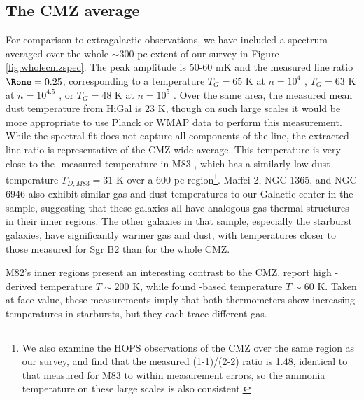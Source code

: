 \subsection{The CMZ average}
For comparison to extragalactic observations, we have included a spectrum
averaged over the whole $\sim300$ pc extent of our survey in Figure
\ref{fig:wholecmzspec}.  The peak amplitude is 50-60 mK and the measured
line ratio $\Rone = 0.25$, corresponding to a temperature $T_G=65$ K at $n=10^4$
\percc, $T_G=63$ K at $n=10^{4.5}$ \percc, or $T_G=48$ K at $n=10^5$ \percc.  
Over the same area, the measured mean dust temperature from HiGal is 23 K,
though on such large scales it would be more appropriate to use Planck or WMAP
data to perform this measurement.
While the spectral fit does not capture all components of the line, the
extracted line ratio is representative of the CMZ-wide average.  This
temperature is very close
to the \ammonia-measured temperature in M83 \citep[56 K;][]{Mangum2013a}, which
has a similarly low dust temperature $T_{D,M83} = 31$ K over a 600 pc
region\footnote{We also examine the HOPS \citep{Walsh2011a} \ammonia
observations of the CMZ over the same region as our \formaldehyde survey, and
find that the measured (1-1)/(2-2) ratio is 1.48, identical to that measured
for M83 to within measurement errors, so the ammonia temperature on these large
scales is also consistent.}.  Maffei 2, NGC 1365, and NGC 6946 also exhibit
similar gas and
dust
temperatures to our Galactic center in the \citet{Mangum2013a} sample,
suggesting that these galaxies all have analogous gas thermal structures in
their inner regions.  The other galaxies in that sample, especially the
starburst galaxies, have significantly warmer gas and dust, with temperatures
closer to those measured for Sgr B2 than for the whole CMZ.

M82's inner regions present an interesting contrast to the CMZ.
\citet{Muhle2007a} report high \para-derived temperature $T\sim200$ K, while
\citet{Weis2001a} found \ammonia-based temperature $T\sim60$ K.
Taken at face value, these measurements imply that both thermometers show
increasing temperatures in starbursts, but they each trace different gas.


